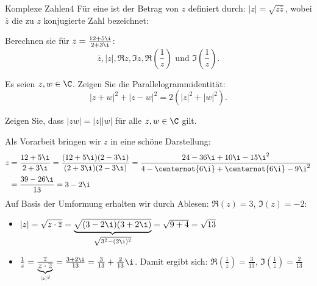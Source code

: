 \begin{aufgabe}{Komplexe Zahlen}{4}
Für eine  ist der Betrag von \(z\) definiert durch: \(|z| = \sqrt{z \overline{z}}\), wobei \(\overline{z}\) die zu \(z\) konjugierte Zahl bezeichnet:
\begin{aufgaben}
    \item Berechnen sie für \(z = \frac{12 + 5\i}{2 + 3\i}\):
          \[\overline{z}, |z|, \Re{z}, \Im{z}, \Re(\frac{1}{z}) \text{ und } \Im(\frac{1}{z}).\]
    \item Es seien \(z,w \in \C\). Zeigen Sie die Parallelogrammidentität: \[|z + w|^2 + |z-w|^2 = 2(|z|^2 + |w|^2).\]
    \item Zeigen Sie, dass \(|zw| = |z||w|\) für alle \(z,w \in \C\) gilt.
\end{aufgaben}\vspace{-1\baselineskip}
\Splitter\nskip
\begin{aufgaben}
    \item Als Vorarbeit bringen wir $z$ in eine schöne Darstellung: \begin{align*}
        z &= \frac{12 + 5\i}{2 + 3\i} = \frac{(12 + 5 \i)(2-3\i)}{(2+3\i)(2-3\i)} = \frac{24 - 36\i + 10\i -15\i^2}{4- \centernot{6\i} + \centernot{6\i} -9\i^2} \\
        &= \frac{39-26\i}{13} = 3-2\i
    \end{align*}
    Auf Basis der Umformung erhalten wir durch Ablesen: $\Re(z) = 3$, $\Im(z) = -2$:
    \begin{itemize}[label=$\diamond$]
    \item $|z| = \sqrt{z \cdot \overline{z}} = \underbrace{\sqrt{(3-2\i)(3+2\i)}}_{\sqrt{3^2 - (2\i)^2}} = \sqrt{9+4} = \sqrt{13}$
    \item $\frac{1}{z} = \frac{\overline{z}}{\underbrace{z \cdot \overline{z}}_{|z|^2}} = \frac{3+2\i}{13} = \frac{3}{13} + \frac{2}{13}\i$. Damit ergibt sich: $\Re(\frac{1}{z}) = \frac{3}{13}$, $\Im(\frac{1}{z}) =  \frac{2}{13}$
    \end{itemize}


\end{aufgaben}
\end{aufgabe}
